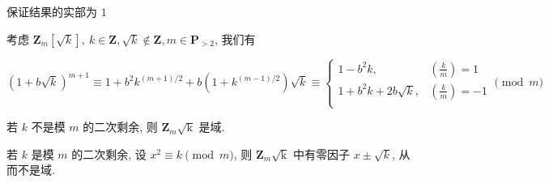 保证结果的实部为 \(1\)

考虑 \(\mathbf{Z}_m\left[\sqrt{k}\right],~k\in\mathbf{Z},\sqrt{k}\notin \mathbf{Z},m\in\mathbf{P}_{>2}\), 我们有

\[
    \left(1+b\sqrt{k}\right)^{m+1}\equiv 1+b^2 k^{(m+1)/2} + b\left(1+k^{(m-1)/2}\right)\sqrt{k} \equiv\begin{cases}
        1-b^2 k,              & \left(\frac{k}{m}\right)=1  \\
        1+b^2 k + 2b\sqrt{k}, & \left(\frac{k}{m}\right)=-1 \\
    \end{cases} \pmod m
\]

若 \(k\) 不是模 \(m\) 的二次剩余, 则 \(\mathbf{Z}_m\mathrm{\sqrt{k}}\) 是域.

若 \(k\) 是模 \(m\) 的二次剩余, 设 \(x^2\equiv k\pmod m\), 则 \(\mathbf{Z}_m\mathrm{\sqrt{k}}\) 中有零因子 \(x\pm\sqrt{k}\), 从而不是域.
